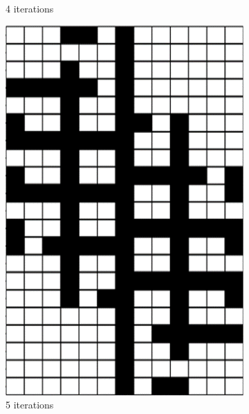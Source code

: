\begin{figure}[H]
\begin{subfigure}[t]{0.3\textwidth}
		\caption{4 iterations}
	\end{subfigure}
	\hfill
	\begin{subfigure}[t]{0.3\textwidth}
		\centering
		\includegraphics[width=\textwidth]{si_ls_5.png}
		\caption{5 iterations}
	\end{subfigure}
	\hfill
	\begin{subfigure}[t]{0.3\textwidth}
		\centering

\end{subfigure}
\end{figure}
